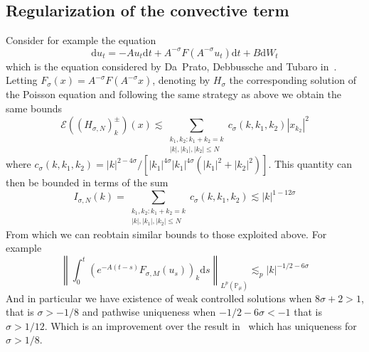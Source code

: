 \documentclass[11pt,a4paper,reqno]{amsart}
\newcommand{\PP}{\mathbb{P}}
\newcommand{\cE}{\mathcal{E}}
\newcommand{\dd}{\mathrm{d}}
\begin{document}
\subsection{Regularization of the convective term}
 Consider for example the equation
\begin{equation}
\label{eq:burgers-daprato}
\dd u_t = - A u_t \dd t + A^{-\sigma}F(A^{-\sigma} u_t) \dd t + B \dd W_t 
\end{equation}
which is the equation considered by Da~Prato, Debbussche and Tubaro in~\cite{DDT}. Letting $F_\sigma(x) = A^{-\sigma}F(A^{-\sigma} x)$, denoting by $H_\sigma$ the corresponding solution of the Poisson equation and following the same strategy as above we obtain the same bounds
$$
 \cE((H_{\sigma,N})^\pm_k)(x)\lesssim     \sum_{\substack{k_1,k_2 :k_1+k_2=k\\|k|,|k_1|,|k_2|\le N}}c_\sigma(k,k_1,k_2) |x_{k_2}|^2  
$$
where $c_\sigma(k,k_1,k_2) = |k|^{2-4\sigma}/[|k_1|^{4\sigma}|k_1|^{4\sigma}(|k_1|^{2}+|k_2|^{2})]$.
This quantity can then be bounded in terms of the sum
$$
I_{\sigma,N}(k) = \sum_{\substack{k_1,k_2 :k_1+k_2=k\\|k|,|k_1|,|k_2|\le N}}c_\sigma(k,k_1,k_2) \lesssim |k|^{1-12\sigma}
$$
From which we can reobtain similar bounds to those exploited above.
For example
$$
\left\|\int_0^t (e^{-A(t-s)}F_{\sigma,M}(u_s))_k \dd  s \right\|_{L^p(\PP_\mu)}\lesssim_p |k|^{-1/2-6\sigma} 
$$
And in particular we have existence of weak controlled solutions when $8\sigma+2>1$, that is $\sigma>-1/8$ and pathwise uniqueness when $-1/2-6\sigma<-1$ that is $\sigma> 1/12$. Which is an improvement over the result in~\cite{DDT} which has uniqueness for $\sigma>1/8$. 
\end{document}
